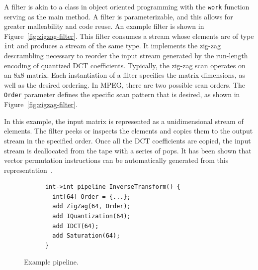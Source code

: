 A filter is akin to a class in object oriented programming with the
{\tt work} function serving as the main method. A filter is parameterizable,
and this allows for greater malleability and code reuse. An example
filter is shown in Figure~\ref{fig:zigzag-filter}. This filter
consumes a stream whose elements are of type {\tt int} and produces a
stream of the same type. It implements the zig-zag descrambling
necessary to reorder the input stream generated by the run-length
encoding of quantized DCT coefficients. Typically, the zig-zag scan
operates on an 8x8 matrix. Each instantiation of a filter specifies the
matrix dimensions, as well as the desired ordering. In MPEG, there are
two possible scan orders. The {\tt Order} parameter defines the
specific scan pattern that is desired, as shown in 
Figure~\ref{fig:zigzag-filter}.

In this example, the input matrix is represented as a unidimensional
stream of elements. The filter peeks or inspects the elements and
copies them to the output stream in the specified order. Once all the
DCT coefficients are copied, the input stream is deallocated from the
tape with a series of pops.  It has been shown that vector permutation
instructions can be automatically generated from this
representation~\cite{yelick04msp}.

\begin{figure}[t]
\end{figure}

\begin{figure}[t]
  \begin{scriptsize}
    \begin{verbatim}
      int->int pipeline InverseTransform() {
        int[64] Order = {...};
        add ZigZag(64, Order);
        add IQuantization(64);
        add IDCT(64);
        add Saturation(64);
      }
    \end{verbatim}
  \end{scriptsize}
  \caption{Example pipeline.}
  \label{fig:decoder-pipeline}
\end{figure}

